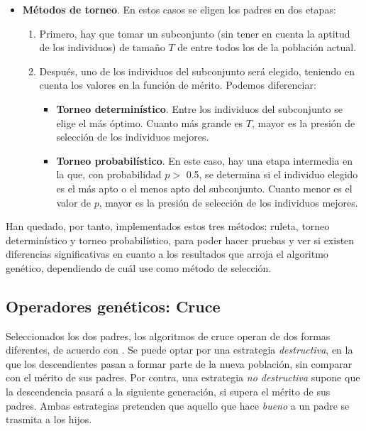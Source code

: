 \documentclass[12pt,a4paper]{book}
\begin{document}
\begin{itemize}
\item \textbf{Métodos de torneo}. En estos casos se eligen los padres en dos etapas:
	\begin{enumerate}
		\item Primero, hay que tomar un subconjunto (sin tener en cuenta la aptitud de los individuos) de tamaño $T$ de entre todos los de la población actual. 
		\item Después, uno de los individuos del subconjunto será elegido, teniendo en cuenta los valores en la función de mérito. Podemos diferenciar: 
			\begin{itemize}
				\item \textbf{Torneo determinístico}. Entre los individuos del subconjunto se elige el más óptimo. Cuanto más grande es $T$, mayor es la presión de selección de los individuos mejores. 
				\item \textbf{Torneo probabilístico}. En este caso, hay una etapa intermedia en la que, con probabilidad $p >$ 0.5, se determina si el individuo elegido es el más apto o el menos apto del subconjunto. Cuanto menor es el valor de $p$, mayor es la presión de selección de los individuos mejores. 
			\end{itemize}					
	\end{enumerate}		
\end{itemize} 

Han quedado, por tanto, implementados estos tres métodos: ruleta, torneo determinístico y torneo probabilístico, para poder hacer pruebas y ver si existen diferencias significativas en cuanto a los resultados que arroja el algoritmo genético, dependiendo de cuál use como método de selección. 


\subsection{Operadores genéticos: Cruce}
Seleccionados los dos padres, los algoritmos de cruce operan de dos formas diferentes, de acuerdo con \cite{gestal_pose_introduccion_2023}. Se puede optar por una estrategia \textsl{destructiva}, en la que los descendientes pasan a formar parte de la nueva población, sin comparar con el mérito de sus padres. Por contra, una estrategia \textsl{no destructiva} supone que la descendencia pasará a la siguiente generación, si supera el mérito de sus padres. Ambas estrategias pretenden que aquello que hace \textsl{bueno} a un padre se trasmita a los hijos. %
\end{document}
